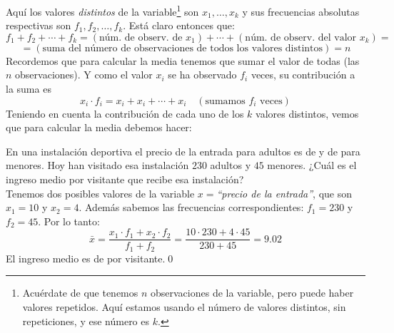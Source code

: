    Aquí los valores {\em distintos} de la variable\footnote{Acuérdate de que tenemos $n$ observaciones de la variable, pero puede haber valores repetidos. Aquí estamos usando el número de valores distintos, sin repeticiones, y ese número es $k$.} son $x_1,\ldots,x_k$ y sus frecuencias absolutas respectivas son $f_1,f_2,\ldots,f_k$. Está claro entonces que:
        \[f_1+f_2+\cdots+f_k=(\mbox{núm. de observ. de }x_1)+\cdots+(\mbox{núm. de observ. del valor }x_k)= \]
        \[=(\mbox{suma del número de observaciones de todos los valores distintos})=n\]
        Recordemos que para calcular la media tenemos que sumar el valor de todas (las $n$ observaciones). Y como el valor $x_i$ se ha observado $f_i$ veces, su contribución a la suma es
        \[x_i\cdot f_i=x_i+x_i+\cdots+x_i\quad (\mbox{sumamos $f_i$ veces})\]
        Teniendo en cuenta la contribución de cada uno de los $k$ valores distintos, vemos que
        para calcular la media debemos hacer:
        \begin{center}
        \end{center}


        \begin{Ejemplo}
        En una instalación deportiva el precio de la entrada para adultos es de  y de  para menores. Hoy han visitado esa instalación $230$ adultos y $45$ menores. ¿Cuál es el ingreso medio por visitante que recibe esa instalación?\\
        Tenemos dos posibles valores de la variable $x=${\em ``precio de la entrada''}, que son $x_1=10$ y $x_2=4$. Además sabemos las frecuencias correspondientes: $f_1=230$ y $f_2=45$. Por lo tanto:
        \[\bar x=\dfrac{x_1\cdot f_1+x_2\cdot f_2}{f_1+f_2}=\dfrac{10\cdot 230+4\cdot 45}{230+45}=9.02\]
        El ingreso medio es de  por visitante.\qed
        \end{Ejemplo}

